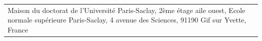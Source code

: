 \documentclass[12pt,a4paper]{book}
\begin{document}
\vspace{10cm} %
\selectfont
\begin{tabular}{p{14cm}r}
\multirow{3}{16cm}[+0mm]{{\color{Prune} Maison du doctorat de l'Université Paris-Saclay, 2ème étage aile ouest, Ecole normale supérieure Paris-Saclay, 4 avenue des Sciences, 91190 Gif sur Yvette, France}} 
\end{tabular}
\end{document}
